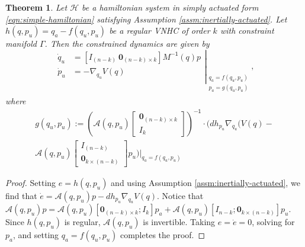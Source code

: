 \documentclass[journal,twoside,onecolumn,draftclsnofoot,web]{ieeecolor}
\newtheorem{thm}{Theorem}%
\newcommand*{\inv}{^\mathsf{-1}}
\newcommand*{\Minv}{M^\mathsf{-1}}
\newcommand*{\Id}[1]{I_{#1}}
\newcommand*{\Zmat}[1]{\bm{0}_{#1}}
\begin{document}
\begin{thm}\label{thm:zero-dynamics}
    Let \(\mathcal{H}\) be a hamiltonian system in simply actuated form
    \eqref{eqn:simple-hamiltonian} satisfying
    Assumption \ref{assm:inertially-actuated}. 
    Let \(h(q,p_u) = q_a - f(q_u,p_u)\) be a regular VNHC of order \(k\) with
    constraint manifold \(\Gamma\). 
    Then the constrained dynamics are given by
    \begin{equation}\label{eqn:qpu-dynamics}
        \left.\begin{aligned}
                \dot{q}_u &= 
                \left[\Id{(n-k)} ~ \Zmat{(n-k) \times k}\right]
                \Minv(q)p \\
            \dot{p}_u &= -\nabla_{q_u}V(q) \\
            \end{aligned}{}\right|_{\begin{array}{c}
                q_a = f(q_u,p_u) \\ 
                p_a = g(q_u,p_u) \\
            \end{array}}
            ,
    \end{equation}
    where
    \begin{multline}\label{eqn:g-qpu}
        g(q_u,p_u) := \left( \mathcal{A}(q,p_u)
        \begin{bmatrix} \Zmat{(n-k)\times k} \\ \Id{k} \end{bmatrix}\right)\inv 
        \cdot
        \Big(dh_{p_u}\nabla_{q_u}(V(q) -
        \\
        \mathcal{A}(q,p_u)
        \begin{bmatrix} \Id{(n-k)} \\ \Zmat{k \times (n-k)} \end{bmatrix} p_u
        \left.\Big)\right|_{q_a = f(q_u,p_u)}
    \end{multline}

\end{thm}
\begin{proof}
    Setting \(e = h(q,p_u)\) and using Assumption
    \ref{assm:inertially-actuated}, we find that
    \(\dot{e} = \mathcal{A}(q,p_u)p - dh_{p_u}\nabla_{q_u}V(q)\).
    Notice that
    \(\mathcal{A}(q,p_u)p = \mathcal{A}(q,p_u)[\Zmat{(n-k)\times k}; \Id{k}]p_a
    + \mathcal{A}(q,p_u)[\Id{n-k};\Zmat{k \times (n-k)}] p_u\).
    Since \(h(q,p_u)\) is regular, \(\mathcal{A}(q,p_u)\) is invertible.
    Taking \(e = \dot{e} = 0\), solving for \(p_a\), and setting 
    \(q_a = f(q_u,p_u)\) completes the proof.
\end{proof}
\end{document}
